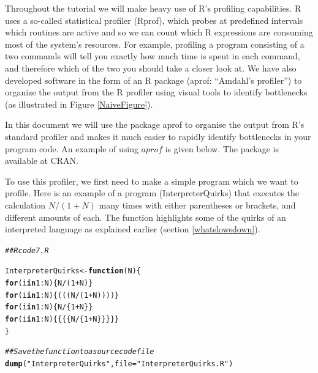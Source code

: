 \documentclass{article}\usepackage[]{graphicx}\usepackage[]{color}
\makeatletter
\newcommand{\hlnum}[1]{\textcolor[rgb]{0.686,0.059,0.569}{#1}}%
\newcommand{\hlstr}[1]{\textcolor[rgb]{0.192,0.494,0.8}{#1}}%
\newcommand{\hlcom}[1]{\textcolor[rgb]{0.678,0.584,0.686}{\textit{#1}}}%
\newcommand{\hlopt}[1]{\textcolor[rgb]{0,0,0}{#1}}%
\newcommand{\hlstd}[1]{\textcolor[rgb]{0.345,0.345,0.345}{#1}}%
\newcommand{\hlkwa}[1]{\textcolor[rgb]{0.161,0.373,0.58}{\textbf{#1}}}%
\newcommand{\hlkwb}[1]{\textcolor[rgb]{0.69,0.353,0.396}{#1}}%
\newcommand{\hlkwc}[1]{\textcolor[rgb]{0.333,0.667,0.333}{#1}}%
\newcommand{\hlkwd}[1]{\textcolor[rgb]{0.737,0.353,0.396}{\textbf{#1}}}%
\newenvironment{kframe}{%
 \def\at@end@of@kframe{}%
 \ifinner\ifhmode%
  \def\at@end@of@kframe{\end{minipage}}%
  \begin{minipage}{\columnwidth}%
 \fi\fi%
 \def\FrameCommand##1{\hskip\@totalleftmargin \hskip-\fboxsep
 \colorbox{shadecolor}{##1}\hskip-\fboxsep
     \hskip-\linewidth \hskip-\@totalleftmargin \hskip\columnwidth}%
 \MakeFramed {\advance\hsize-\width
   \@totalleftmargin\z@ \linewidth\hsize
   \@setminipage}}%
 {\par\unskip\endMakeFramed%
 \at@end@of@kframe}
\newenvironment{knitrout}{}{} %
\makeatother
\begin{document}
Throughout the tutorial we will make heavy use of R's profiling capabilities. R uses a so-called statistical profiler (Rprof), which probes at predefined intervals which routines are active and so we can count which R expressions are consuming most of the system's resources. For example, profiling a program consisting of a two commands will tell you exactly how much time is spent in each command, and therefore which of the two you should take a closer look at. We have also developed software in the form of an R package (aprof: “Amdahl's profiler”) to organize the output from the R profiler using visual tools to identify bottlenecks (as illustrated in Figure \ref{NaiveFigure}). 
  
In this document we will use the package aprof to organise the output from R's standard profiler and makes it much easier to rapidly identify bottlenecks in your program code. An example of using $aprof$ is given below. The package is available at CRAN.

To use this profiler, we first need to make a simple program which we want to profile. Here is an example of a program (InterpreterQuirks) that executes the calculation $N/(1+N)$ many times with either parentheses or brackets, and different amounts of each. The function highlights some of the quirks of an interpreted language as explained earlier (section \ref{whatslowsdown}).

\begin{knitrout}
\color{fgcolor}\begin{kframe}
\begin{alltt}
\hlcom{## Rcode7.R}

\hlstd{InterpreterQuirks}\hlkwb{<-}\hlkwa{function}\hlstd{(}\hlkwc{N}\hlstd{)\{}
  \hlkwa{for} \hlstd{(i} \hlkwa{in} \hlnum{1}\hlopt{:}\hlstd{N) \{ N}\hlopt{/}\hlstd{(}\hlnum{1}\hlopt{+}\hlstd{N) \}}
  \hlkwa{for} \hlstd{(i} \hlkwa{in} \hlnum{1}\hlopt{:}\hlstd{N) \{ (((N}\hlopt{/}\hlstd{(}\hlnum{1}\hlopt{+}\hlstd{N))))\}}
  \hlkwa{for} \hlstd{(i} \hlkwa{in} \hlnum{1}\hlopt{:}\hlstd{N) \{ N}\hlopt{/}\hlstd{\{}\hlnum{1}\hlopt{+}\hlstd{N\} \}}
  \hlkwa{for} \hlstd{(i} \hlkwa{in} \hlnum{1}\hlopt{:}\hlstd{N) \{ \{\{\{N}\hlopt{/}\hlstd{\{}\hlnum{1}\hlopt{+}\hlstd{N\}\}\}\} \}}
\hlstd{\}}

\hlcom{## Save the function to a source code file}
\hlkwd{dump}\hlstd{(}\hlstr{"InterpreterQuirks"}\hlstd{,}\hlkwc{file}\hlstd{=}\hlstr{"InterpreterQuirks.R"}\hlstd{)}
\end{alltt}
\end{kframe}
\end{knitrout}
\end{document}
